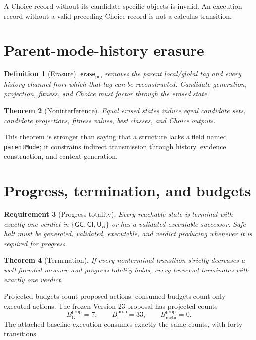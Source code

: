 \documentclass[10pt]{article}
\newtheorem{definition}{Definition}[section]
\newtheorem{theorem}[definition]{Theorem}
\newtheorem{requirement}[definition]{Requirement}
\newcommand{\Loc}{\mathsf L}
\newcommand{\Glob}{\mathsf G}
\newcommand{\GC}{\mathsf{GC}}
\newcommand{\GI}{\mathsf{GI}}
\newcommand{\UB}{\mathsf{U}_B}
\begin{document}
A Choice record without its candidate-specific objects is invalid.  An execution record without a valid preceding Choice record is not a calculus transition.

\section{Parent-mode-history erasure}

\begin{definition}[Erasure]
$\mathsf{erase}_{\mathrm{pm}}$ removes the parent local/global tag and every history channel from which that tag can be reconstructed.  Candidate generation, projection, fitness, and Choice must factor through the erased state.
\end{definition}

\begin{theorem}[Noninterference]
Equal erased states induce equal candidate sets, candidate projections, fitness values, best classes, and Choice outputs.
\end{theorem}

This theorem is stronger than saying that a structure lacks a field named \texttt{parentMode}; it constrains indirect transmission through history, evidence construction, and context generation.

\section{Progress, termination, and budgets}

\begin{requirement}[Progress totality]
Every reachable state is terminal with exactly one verdict in $\{\GC,\GI,\UB\}$ or has a validated executable successor.  Safe halt must be generated, validated, executable, and verdict producing whenever it is required for progress.
\end{requirement}

\begin{theorem}[Termination]
If every nonterminal transition strictly decreases a well-founded measure and progress totality holds, every traversal terminates with exactly one verdict.
\end{theorem}

Projected budgets count proposed actions; consumed budgets count only executed actions.  The frozen Version-23 proposal has projected counts
\[
B_\Glob^{\mathrm{prop}}=7,\qquad
B_\Loc^{\mathrm{prop}}=33,\qquad
B_{\mathrm{meta}}^{\mathrm{prop}}=0.
\]
The attached baseline execution consumes exactly the same counts, with forty transitions.
\end{document}

